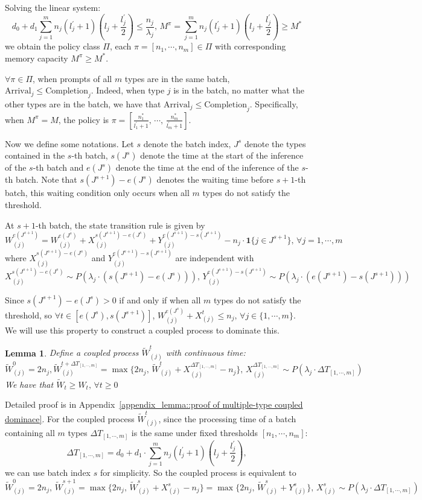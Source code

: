 \documentclass[preprint]{article}
\theoremstyle{plain}
\newtheorem{lemma}[theorem]{Lemma}
\theoremstyle{definition}
\theoremstyle{remark}
\begin{document}
Solving the linear system:
$$d_0+d_1\sum_{j=1}^mn_j(l_j^\prime+1)\left(l_j+\frac{l_j^\prime}{2}\right)\leq \frac{n_j}{\lambda_j},\,M^{\pi} = \sum_{j=1}^mn_j(l_j^\prime+1)\left(l_j+\frac{l_j^\prime}{2}\right)\geq  M^{*}$$
we obtain the policy class $\Pi$, each $\pi = [n_1,\cdots,n_m]\in \Pi$ with corresponding memory capacity $M^{\pi} \geq  M^*$.

$\forall \pi \in \Pi$, when prompts of all $m$ types are in the same batch, $\text{Arrival}_j\leq \text{Completion}_j$. Indeed, when type $j$ is in the batch, no matter what the other types are in the batch, we have that $\text{Arrival}_j\leq \text{Completion}_j$. Specifically, when $M^\pi = M$, the policy is $\pi = [ \frac{n_1^*}{l_1^\prime+1},\,\cdots,\,\frac{n_m^*}{l_m^\prime+1} ]$. 

Now we define some notations. Let $s$ denote the batch index, $J^s$ denote the types contained in the $s$-th batch, $s(J^s)$ denote the time at the start of the inference of the $s$-th batch and $e(J^s)$ denote the time at the end of the inference of the $s$-th batch. Note that $s(J^{s+1})-e(J^s)$ denotes the waiting time before $s+1$-th batch, this waiting condition only occurs when all $m$ types do not satisfy the threshold.

At $s+1$-th batch, the state transition rule is given by
$$W_{(j)}^{e(J^{s+1})}=W_{(j)}^{e(J^s)}+X_{(j)}^{s(J^{s+1})-e(J^{s})}+Y_{(j)}^{e(J^{s+1})-s(J^{s+1})}- n_j\cdot \mathbf{1}\{j\in J^{s+1}\} ,\,\forall j  = 1,\cdots,m$$
where $X_{(j)}^{s(J^{s+1})-e(J^{s})}$ and $Y_{(j)}^{e(J^{s+1})-s(J^{s+1})}$ are independent with
$$X_{(j)}^{s(J^{s+1})-e(J^{s})} \sim P(\lambda_j \cdot (s(J^{s+1})-e(J^{s}))),\,Y_{(j)}^{e(J^{s+1})-s(J^{s+1})} \sim P(\lambda_j \cdot (e(J^{s+1})-s(J^{s+1})))$$

Since $s(J^{s+1})-e(J^{s})>0$ if and only if  when all $m$ types do not satisfy the threshold, so $\forall t \in [e(J^s), s(J^{s+1})]$, $W_{(j)}^{e(J^s)}+X^t_{(j)}\leq n_j,\, \forall j \in \{1,\cdots,m\}$. We will use this property to construct a coupled process to dominate this. 

\begin{lemma}\label{lemma::multiple-type coupled dominace}
Define a coupled process $\tilde{W}^t_{(j)}$ with continuous time:
$$\tilde{W}_{(j)}^0=2n_j, \tilde{W}_{(j)}^{t+\Delta T_{[1,\cdots,m]}}= \max\{ 2n_j,\, \tilde{W}_{(j)}^t +X_{(j)}^{\Delta T_{[1,\cdots,m]}}-n_j \},\, X^{\Delta T_{[1,\cdots,m]}}_{(j)} \sim P(\lambda_j\cdot \Delta T_{[1,\cdots,m]}) $$
We have that $\tilde{W}_t\geq W_t,\,\forall t\geq 0$
\end{lemma}
Detailed proof is in Appendix~\ref{appendix_lemma::proof of multiple-type coupled dominace}. For the coupled process $\tilde{W}^t_{(j)}$, since the processing time of a batch containing all $m$ types $\Delta T_{[1,\cdots,m]}$ is the same under fixed thresholds $[n_1,\cdots,n_m]$:
$$\Delta T_{[1,\cdots,m]} =  d_0 + d_1 \cdot \sum_{j=1}^m n_j(l_j^\prime+1)\left( l_j+\frac{l_j^\prime}{2} \right) ,$$
we can use batch index $s$ for simplicity. So the coupled process is equivalent to
$$\tilde{W}^0_{(j)} = 2n_j,\, \tilde{W}^{s+1}_{(j)} = \max\{ 2n_j, \, \tilde{W}^s_{(j)}+X^s_{(j)} - n_j \}=\max\{ 2n_j, \, \tilde{W}^s_{(j)}+Y^s_{(j)} \},\, X^s_{(j)} \sim P(\lambda_j \cdot \Delta T_{[1,\cdots,m]})  $$
\end{document}
